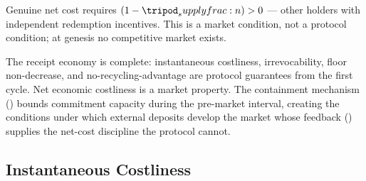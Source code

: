 \documentclass[../main.tex]{subfiles}
\begin{document}
\begin{remark}
    \label{rem:costliness:two-regimes}
    Genuine net cost requires $(1 - \supplyfrac{}) > 0$ --- other holders with independent
    redemption incentives. This is a market condition, not a protocol condition; at genesis
    no competitive market exists.
\end{remark}

\begin{insight}
    \label{intuit:costliness:design-problem}
    The receipt economy is complete: instantaneous costliness, irrevocability, floor
    non-decrease, and no-recycling-advantage are protocol guarantees from the first cycle.
    Net economic costliness is a market property. The containment mechanism
    () bounds commitment capacity during the pre-market interval,
    creating the conditions under which external deposits develop the market whose feedback
    () supplies the net-cost discipline the protocol cannot.
\end{insight}

\subsection{Instantaneous Costliness}
\label{sec:costliness:instantaneous}
\end{document}
